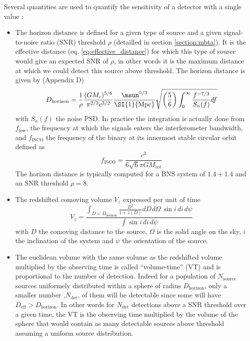 Several quantities are used to quantify the sensitivity of a detector with a single value \cite{findchirp,distances,one_ifo}:
\begin{itemize}
\item The horizon distance is defined for a given type of source and a given signal-to-noise ratio (SNR) threshold $\rho$ (detailled in section \ref{section:mbta}).
  It is the effective distance (eq. \ref{eq:effective_distance}) for which this type of source would give an expected SNR of $\rho$, in other words it is the maximum distance at which we could detect this source above threshold.
  The horizon distance is given by \cite{findchirp} (Appendix D)
  \begin{equation}
    D_{\textrm{horizon}} = \frac{1}{\rho} \frac{(GM_c)^{5/6}}{\pi^{2/3}c^{3/2}} \frac{\msun^{5/3}}{\textrm{\SI{1}{Mpc}}} \sqrt{\left(\frac{5}{6}\right) \int_{0}^{\infty}\frac{f^{-7/3}}{S_n(f)}df}
    \label{eq:horizon}
  \end{equation}
  with $S_n(f)$ the noise PSD.
  In practice the integration is actually done from $f_{\textrm{low}}$, the frequency at which the signals enters the interferometer bandwidth, and $f_{\textrm{ISCO}}$ the frequency of the binary at its innermost stable circular orbit defined as
\begin{equation}
  f_{\textrm{ISCO}} = \frac{c^3}{6\sqrt{6}\pi G M_{\textrm{tot}}}
\end{equation}
The horizon distance is typically computed for a BNS system of $1.4+1.4$ \msun and an SNR threshold $\rho=8$.

\item The redshifted comoving volume $V_z$ expressed per unit of time \cite{distances}
  \begin{equation}
    V_z = \frac{ \int_{D<D_{\textrm{horizon}}} \frac{D^2}{1+z(D)} dD \hspace{1pt} d\Omega \hspace{2pt} \sin i \hspace{2pt} di \hspace{2pt} d\psi}{\int \sin i \hspace{2pt} di \hspace{2pt} d\psi}
  \end{equation}
  with $D$ the comoving distance to the source, $\Omega$ is the solid angle on the sky, $i$ the inclination of the system and $\psi$ the orientation of the source.

\item The euclidean volume with the same volume as the redshifted volume multiplied by the observing time is called ``volume-time'' (VT) and is proportional to the number of detection.
  Indeed for a population of $N_{\textrm{source}}$ sources uniformely distributed within a sphere of radius $D_{\textrm{horizon}}$, only a smaller number ,$N_{\textrm{det}}$, of them will be detectable since some will have $D_{\textrm{eff}}>D_{\textrm{horizon}}$.
  In other words for $N_{\textrm{det}}$ detections above a SNR threshold over a given time, the VT is the observing time multiplied by the volume of the sphere that would contain as many detectable sources above threshold assuming a uniform source distribution.
  

\end{itemize}
